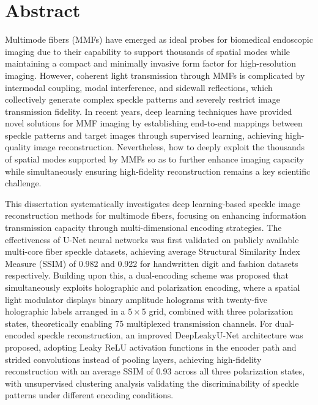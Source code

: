 \intobmk\chapter*{Abstract}%

Multimode fibers (MMFs) have emerged as ideal probes for biomedical endoscopic imaging due to their capability to support thousands of spatial modes while maintaining a compact and minimally invasive form factor for high-resolution imaging. However, coherent light transmission through MMFs is complicated by intermodal coupling, modal interference, and sidewall reflections, which collectively generate complex speckle patterns and severely restrict image transmission fidelity. In recent years, deep learning techniques have provided novel solutions for MMF imaging by establishing end-to-end mappings between speckle patterns and target images through supervised learning, achieving high-quality image reconstruction. Nevertheless, how to deeply exploit the thousands of spatial modes supported by MMFs so as to further enhance imaging capacity while simultaneously ensuring high-fidelity reconstruction remains a key scientific challenge.

This dissertation systematically investigates deep learning-based speckle image reconstruction methods for multimode fibers, focusing on enhancing information transmission capacity through multi-dimensional encoding strategies. The effectiveness of U-Net neural networks was first validated on publicly available multi-core fiber speckle datasets, achieving average Structural Similarity Index Measure (SSIM) of 0.982 and 0.922 for handwritten digit and fashion datasets respectively. Building upon this, a dual-encoding scheme was proposed that simultaneously exploits holographic and polarization encoding, where a spatial light modulator displays binary amplitude holograms with twenty-five holographic labels arranged in a $5\times5$ grid, combined with three polarization states, theoretically enabling 75 multiplexed transmission channels. For dual-encoded speckle reconstruction, an improved DeepLeakyU-Net architecture was proposed, adopting Leaky ReLU activation functions in the encoder path and strided convolutions instead of pooling layers, achieving high-fidelity reconstruction with an average SSIM of 0.93 across all three polarization states, with unsupervised clustering analysis validating the discriminability of speckle patterns under different encoding conditions.

